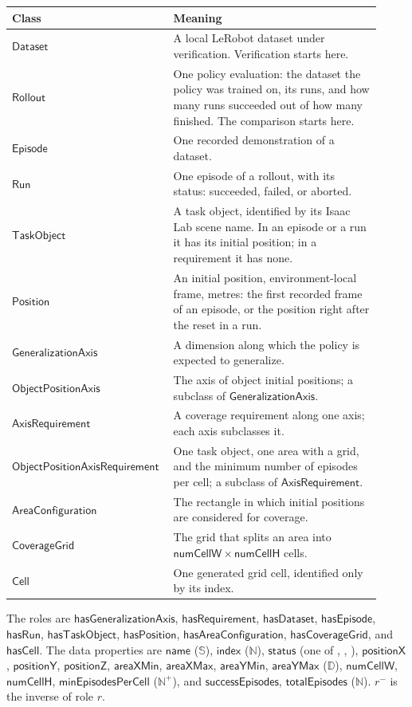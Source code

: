 \documentclass[11pt]{article}
\DeclareRobustCommand{\code}{\codeurl}  %
\begin{document}
\begin{longtable}{L{0.37\linewidth}L{0.55\linewidth}}
\toprule
\textbf{Class} & \textbf{Meaning} \\
\midrule
\(\mathsf{Dataset}\) & A local LeRobot dataset under verification. Verification starts here. \\
\(\mathsf{Rollout}\) & One policy evaluation: the dataset the policy was trained on, its runs, and how many runs
  succeeded out of how many finished. The comparison starts here. \\
\(\mathsf{Episode}\) & One recorded demonstration of a dataset. \\
\(\mathsf{Run}\) & One episode of a rollout, with its status: succeeded, failed, or aborted. \\
\(\mathsf{TaskObject}\) & A task object, identified by its Isaac Lab scene name. In an episode or a run it has its
  initial position; in a requirement it has none. \\
\(\mathsf{Position}\) & An initial position, environment-local frame, metres: the first recorded frame of an episode, or the position right after the reset in a run. \\
\(\mathsf{GeneralizationAxis}\) & A dimension along which the policy is expected to generalize. \\
\(\mathsf{ObjectPositionAxis}\) & The axis of object initial positions; a subclass of \(\mathsf{GeneralizationAxis}\). \\
\(\mathsf{AxisRequirement}\) & A coverage requirement along one axis; each axis subclasses it. \\
\(\mathsf{ObjectPositionAxisRequirement}\) & One task object, one area with a grid, and the minimum number of episodes
  per cell; a subclass of \(\mathsf{AxisRequirement}\). \\
\(\mathsf{AreaConfiguration}\) & The rectangle in which initial positions are considered for coverage. \\
\(\mathsf{CoverageGrid}\) & The grid that splits an area into \(\mathsf{numCellW}\times\mathsf{numCellH}\) cells. \\
\(\mathsf{Cell}\) & One generated grid cell, identified only by its index. \\
\bottomrule
\end{longtable}

{\sloppy The roles are \(\mathsf{hasGeneralizationAxis}\), \(\mathsf{hasRequirement}\), \(\mathsf{hasDataset}\),
\(\mathsf{hasEpisode}\), \(\mathsf{hasRun}\), \(\mathsf{hasTaskObject}\), \(\mathsf{hasPosition}\),
\(\mathsf{hasAreaConfiguration}\), \(\mathsf{hasCoverageGrid}\), and \(\mathsf{hasCell}\). The data properties are
\(\mathsf{name}\) (\(\mathbb{S}\)), \(\mathsf{index}\) (\(\mathbb{N}\)), \(\mathsf{status}\) (one of
\code{"succeeded"}, \code{"failed"}, \code{"aborted"}), \(\mathsf{positionX}\), \(\mathsf{positionY}\), \(\mathsf{positionZ}\),
\(\mathsf{areaXMin}\), \(\mathsf{areaXMax}\), \(\mathsf{areaYMin}\), \(\mathsf{areaYMax}\) (\(\mathbb{D}\)),
\(\mathsf{numCellW}\), \(\mathsf{numCellH}\), \(\mathsf{minEpisodesPerCell}\) (\(\mathbb{N}^{+}\)), and
\(\mathsf{successEpisodes}\), \(\mathsf{totalEpisodes}\) (\(\mathbb{N}\)). \(r^{-}\) is the inverse of role \(r\).\par}
\end{document}
